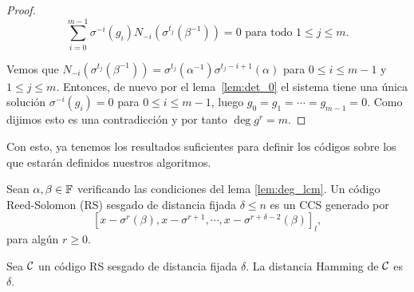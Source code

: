 \begin{proof}
\begin{equation}
\label{linear_system_2}
    \sum_{i=0}^{m-1} \sigma^{-i}(g_i)N_{-i}(\sigma^{t_j}(\beta^{-1})) = 0 \text{ para todo } 1 \leq j \leq m.
\end{equation}

Vemos que \(N_{-i}(\sigma^{t_j}(\beta^{-1})) = \sigma^{t_j}(\alpha^{-1})\sigma^{t_j - i + 1}(\alpha)\) para \(0 \leq i \leq m-1\) y \(1 \leq j \leq m\). Entonces, de nuevo por el lema~\ref{lem:det_0} el sistema tiene una única solución \(\sigma^{-i}(g_i) = 0\) para \(0 \leq i \leq m-1\), luego  \(g_0 = g_1 = \cdots = g_{m-1} = 0\). Como dijimos esto es una contradicción y por tanto \(\deg g^r = m\).
\end{proof}

Con esto, ya tenemos los resultados suficientes para definir los códigos sobre los que estarán definidos nuestros algoritmos.

\begin{definition}
\label{def:RS_code}
    Sean \(\alpha, \beta \in \mathbb{F}\) verificando las condiciones del lema \ref{lem:deg_lcm}. Un código Reed-Solomon (RS) sesgado de distancia fijada \(\delta \leq n\) es un CCS generado por \[{[x - \sigma^r(\beta), x - \sigma^{r+1}, \cdots, x - \sigma^{r + \delta -2}(\beta)]}_l,\] para algún \(r \geq 0\).
\end{definition}

\begin{theorem}
\label{th:distance}
    Sea \(\mathcal{C}\) un código RS sesgado de distancia fijada \(\delta\). La distancia Hamming de \(\mathcal{C}\) es \(\delta\).
\end{theorem}

